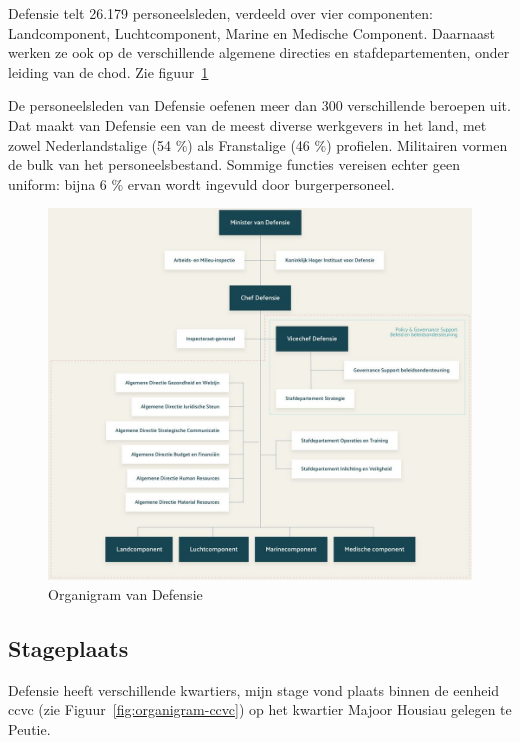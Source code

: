 Defensie telt 26.179 personeelsleden, verdeeld over vier componenten: Landcomponent, Luchtcomponent, Marine en Medische Component. Daarnaast werken ze ook op de verschillende algemene directies en stafdepartementen, onder leiding van de \gls{chod}. Zie figuur~\ref{fig:organigram-defensie}

De personeelsleden van Defensie oefenen meer dan 300 verschillende beroepen uit. Dat maakt van Defensie een van de meest diverse werkgevers in het land, met zowel Nederlandstalige (54 \%) als Franstalige (46 \%) profielen. Militairen vormen de bulk van het personeelsbestand. Sommige functies vereisen echter geen uniform: bijna 6 \% ervan wordt ingevuld door burgerpersoneel. \autocite{Defensie2022}

\begin{figure}
    \includegraphics[width=\textwidth]{img/organigram-defensie.png}
    \caption{\label{fig:organigram-defensie}Organigram van Defensie~\autocite{Defensie2022}}
\end{figure}

\subsection{Stageplaats}

Defensie heeft verschillende \glspl{kwartier}, mijn stage vond plaats binnen de \gls{eenheid} \gls{ccvc} (zie Figuur~\ref{fig:organigram-ccvc}) op het \gls{kwartier} Majoor Housiau gelegen te Peutie.

